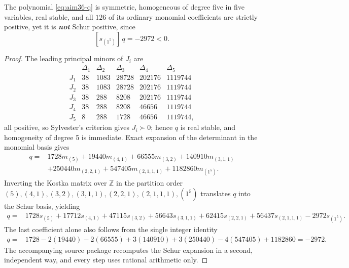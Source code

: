 \begin{cxrefutation}
\begin{theorem}\label{thm:aim36}
The polynomial \eqref{eq:aim36-q} is symmetric, homogeneous of degree five in five variables, real stable, and all $126$ of its ordinary monomial coefficients are strictly positive, yet it is \emph{\textbf{not}} Schur positive, since
\[
[s_{(1^5)}]\,q=-2972<0.
\]
\end{theorem}
\begin{proof}
The leading principal minors of $J_i$ are
\[
\begin{array}{c|rrrrr}
 &\Delta_1&\Delta_2&\Delta_3&\Delta_4&\Delta_5\\ \hline
J_1&38&1083&28728&202176&1119744\\
J_2&38&1083&28728&202176&1119744\\
J_3&38&288&8208&202176&1119744\\
J_4&38&288&8208&46656&1119744\\
J_5&8&288&1728&46656&1119744,
\end{array}
\]
all positive, so Sylvester's criterion gives $J_i\succ0$; hence $q$ is real stable, and homogeneity of degree 5 is immediate. %
Exact expansion of the determinant in the monomial basis gives
\begin{equation*}
  \begin{split}
    q={}&1728m_{(5)}+19440m_{(4,1)}+66555m_{(3,2)}+140910m_{(3,1,1)}\\
    &+250440m_{(2,2,1)}+547405m_{(2,1,1,1)}+1182860m_{(1^5)}.
  \end{split}
\end{equation*}
Inverting the Kostka matrix over $\mathbb Z$ in the partition order $(5),(4,1),(3,2),(3,1,1),(2,2,1),(2,1,1,1),(1^5)$ translates $q$ into the Schur basis, yielding
\begin{align*}
q={}&1728s_{(5)}+17712s_{(4,1)}+47115s_{(3,2)}+56643s_{(3,1,1)}+62415s_{(2,2,1)}+56437s_{(2,1,1,1)}-2972s_{(1^5)}.
\end{align*}
The last coefficient alone also follows from the single integer identity
\begin{align*}
[s_{(1^5)}]q={}&1728-2(19440)-2(66555)+3(140910)+3(250440)-4(547405)+1182860=-2972.
\end{align*}
The accompanying source package recomputes the Schur expansion in a second, independent way, and every step uses rational arithmetic only.
\end{proof}


\end{cxrefutation}
